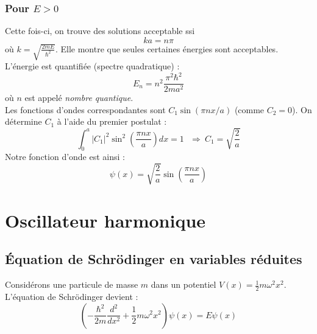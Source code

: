\documentclass	[11pt, a4paper, openany]{book}
\begin{document}
\subsubsection*{Pour $E > 0$}
Cette fois-ci, on trouve des solutions acceptable ssi
\begin{equation}
ka = n\pi
\end{equation}
où $k = \sqrt{\frac{2mE}{\hbar^2}}$. Elle montre que seules certaines énergies sont acceptables. L'énergie est quantifiée (spectre quadratique) :
\begin{equation}
E_n = n^2 \frac{\pi^2\hbar^2}{2ma^2}
\end{equation}
où $n$ est appelé \textit{nombre quantique}.\\

Les fonctions d'ondes correspondantes sont $C_1\sin(\pi n x/a)$ (comme $C_2 = 0$). On détermine $C_1$ à l'aide du premier postulat :
\begin{equation}
\int_0^a |C_1|^2\sin^2\left(\frac{\pi n x}{a}\right)dx = 1\ \ \ \Rightarrow\ C_1 = \sqrt{\frac{2}{a}}
\end{equation}
Notre fonction d'onde est ainsi :
\begin{equation}
\psi(x) = \sqrt{\frac{2}{a}}\sin\left(\frac{\pi n x}{a}\right)
\end{equation}


\section{Oscillateur harmonique}
\subsection{Équation de Schrödinger en variables réduites}
Considérons une particule de masse $m$ dans un potentiel $V(x) = \frac{1}{2}m\omega^2x^2$. L'équation de Schrödinger devient :
\begin{equation}
\left(-\frac{\hbar^2}{2m}\frac{d^2}{dx^2} + \frac{1}{2}m\omega^2x^2\right)\psi(x) = E\psi(x)
\end{equation}
\end{document}
